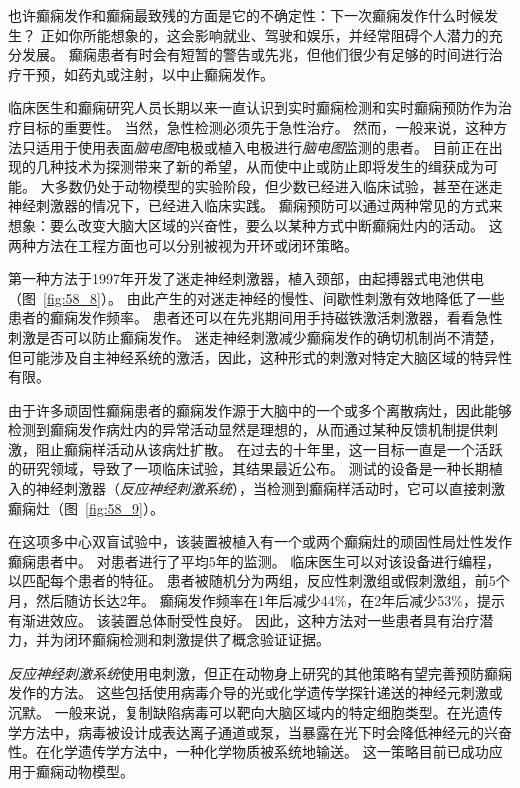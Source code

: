 \begin{proposition}[实时检测和预防癫痫的新方法] \label{box:58_2}
	
	\quad \quad 也许癫痫发作和癫痫最致残的方面是它的不确定性：下一次癫痫发作什么时候发生？
	正如你所能想象的，这会影响就业、驾驶和娱乐，并经常阻碍个人潜力的充分发展。
	癫痫患者有时会有短暂的警告或先兆，但他们很少有足够的时间进行治疗干预，如药丸或注射，以中止癫痫发作。
	
	\quad \quad 临床医生和癫痫研究人员长期以来一直认识到实时癫痫检测和实时癫痫预防作为治疗目标的重要性。
	当然，急性检测必须先于急性治疗。
	然而，一般来说，这种方法只适用于使用表面\textit{脑电图}电极或植入电极进行\textit{脑电图}监测的患者。
	目前正在出现的几种技术为探测带来了新的希望，从而使中止或防止即将发生的缉获成为可能。
	大多数仍处于动物模型的实验阶段，但少数已经进入临床试验，甚至在迷走神经刺激器的情况下，已经进入临床实践。
	癫痫预防可以通过两种常见的方式来想象：要么改变大脑大区域的兴奋性，要么以某种方式中断癫痫灶内的活动。
	这两种方法在工程方面也可以分别被视为开环或闭环策略。
	
	\quad \quad 第一种方法于1997年开发了迷走神经刺激器，植入颈部，由起搏器式电池供电（图~\ref{fig:58_8}）。
	由此产生的对迷走神经的慢性、间歇性刺激有效地降低了一些患者的癫痫发作频率。
	患者还可以在先兆期间用手持磁铁激活刺激器，看看急性刺激是否可以防止癫痫发作。
	迷走神经刺激减少癫痫发作的确切机制尚不清楚，但可能涉及自主神经系统的激活，因此，这种形式的刺激对特定大脑区域的特异性有限。
	
	\quad \quad 由于许多顽固性癫痫患者的癫痫发作源于大脑中的一个或多个离散病灶，因此能够检测到癫痫发作病灶内的异常活动显然是理想的，从而通过某种反馈机制提供刺激，阻止癫痫样活动从该病灶扩散。
	在过去的十年里，这一目标一直是一个活跃的研究领域，导致了一项临床试验，其结果最近公布。
	测试的设备是一种长期植入的神经刺激器（\textit{反应神经刺激系统}），当检测到癫痫样活动时，它可以直接刺激癫痫灶（图~\ref{fig:58_9}）。
	
	\quad \quad 在这项多中心双盲试验中，该装置被植入有一个或两个癫痫灶的顽固性局灶性发作癫痫患者中。
	对患者进行了平均5年的监测。
	临床医生可以对该设备进行编程，以匹配每个患者的特征。
	患者被随机分为两组，反应性刺激组或假刺激组，前5个月，然后随访长达2年。
	癫痫发作频率在1年后减少44\%，在2年后减少53\%，提示有渐进效应。
	该装置总体耐受性良好。
	因此，这种方法对一些患者具有治疗潜力，并为闭环癫痫检测和刺激提供了概念验证证据。
	
	\quad \quad \textit{反应神经刺激系统}使用电刺激，但正在动物身上研究的其他策略有望完善预防癫痫发作的方法。
	这些包括使用病毒介导的光或化学遗传学探针递送的神经元刺激或沉默。
	一般来说，复制缺陷病毒可以靶向大脑区域内的特定细胞类型。在光遗传学方法中，病毒被设计成表达离子通道或泵，当暴露在光下时会降低神经元的兴奋性。在化学遗传学方法中，一种化学物质被系统地输送。
	这一策略目前已成功应用于癫痫动物模型。
	

\end{proposition}
